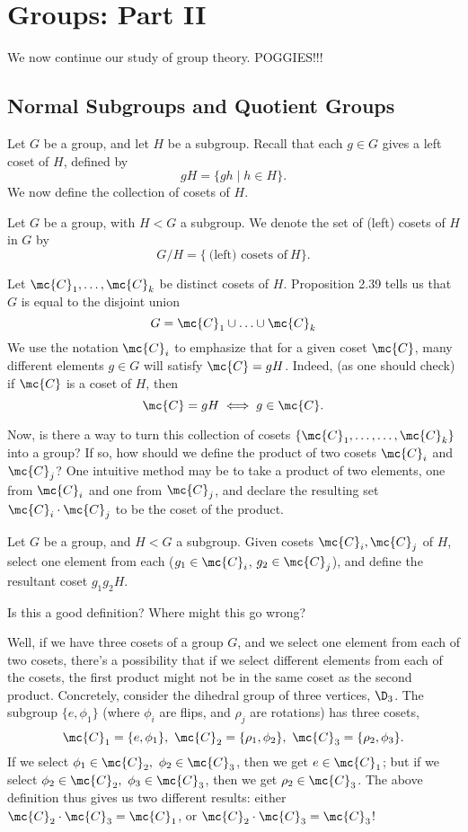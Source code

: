 \documentclass[math1530-lecture-notes]{subfiles}
\begin{document}
\chapter{Groups: Part II}

We now continue our study of group theory. POGGIES!!!

\section{Normal Subgroups and Quotient Groups}

Let $G$ be a group, and let $H$ be a subgroup. Recall that each $g\in G$ gives a left coset of $H$,
defined by \[
  gH = \{gh\mid h\in H\} 
.\] We now define the collection of cosets of $H$.

\begin{definition}{}
  Let $G$ be a group, with $H<G$ a subgroup. We denote the set of (left) cosets of $H$ in $G$ by \[
    G / H = \{ ~\text{(left) cosets of}~ H\}
  .\] 
\end{definition}

Let $\mc{C}_1, \ldots,\mc{C}_k$ be distinct cosets of $H$. Proposition 2.39 tells us that $G$ is
equal to the disjoint union \[
  G = \mc{C}_1\cup \ldots\cup \mc{C}_k
\] We use the notation $\mc{C}_i$ to emphasize that for a given coset $\mc{C}$, many different
elements $g\in G$ will satisfy $\mc{C}=gH$. Indeed, (as one should check) if $\mc{C}$ is a coset of
$H$, then \[
  \mc{C}=gH \iff g\in \mc{C}
.\] 

Now, is there a way to turn this collection of cosets $\{ \mc{C}_1,\ldots,\ldots,\mc{C}_k \}$ into a
group? If so, how should we define the product of two cosets $\mc{C}_i$ and $\mc{C}_j$? One
intuitive method may be to take a product of two elements, one from $\mc{C}_i$ and one from
$\mc{C}_j$, and declare the resulting set $\mc{C}_i\cdot \mc{C}_j$ to be the coset of the product.

\begin{definition}{}
  Let $G$ be a group, and $H < G$ a subgroup. Given cosets $\mc{C}_i, \mc{C}_j$ of $H$, select one
  element from each ($g_1\in \mc{C}_i$, $g_2\in \mc{C}_j$), and define the resultant coset
  $g_1g_2H$.
\end{definition}

Is this a good definition? Where might this go wrong?

Well, if we have three cosets of a group $G$, and we select one element from each of two cosets,
there's a possibility that if we select different elements from each of the cosets, the first
product might not be in the same coset as the second product. Concretely, consider the dihedral
group of three vertices, $\D_3$. The subgroup $\{ e, \phi_1 \}$ (where $\phi_i$ are flips, and
$\rho_j$ are rotations) has three cosets, \[
  \mc{C}_1 = \{ e,\phi_1 \},\ \mc{C}_2=\{ \rho_1,\phi_2 \},\ \mc{C}_3=\{ \rho_2,\phi_3 \}
.\] If we select $\phi_1\in \mc{C}_2,\ \phi_2\in \mc{C}_3$, then we get $e\in \mc{C}_1$; but if we
select $\phi_2\in \mc{C}_2,\ \phi_3\in \mc{C}_3$, then we get $\rho_2\in \mc{C}_3$. The above
definition thus gives us two different results: either $\mc{C}_2\cdot \mc{C}_3=\mc{C}_1$, or
$\mc{C}_2\cdot \mc{C}_3=\mc{C}_3$!
\end{document}
